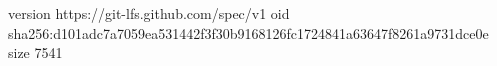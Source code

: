 version https://git-lfs.github.com/spec/v1
oid sha256:d101adc7a7059ea531442f3f30b9168126fc1724841a63647f8261a9731dce0e
size 7541

